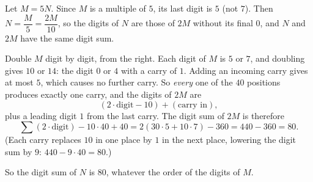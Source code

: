 Let $M=5N$. Since $M$ is a multiple of $5$, its last digit is $5$ (not $7$). Then $N=\dfrac{M}{5}=\dfrac{2M}{10}$, so the digits of $N$ are those of $2M$ without its final $0$, and $N$ and $2M$ have the same digit sum.

Double $M$ digit by digit, from the right. Each digit of $M$ is $5$ or $7$, and doubling gives $10$ or $14$: the digit $0$ or $4$ with a carry of $1$. Adding an incoming carry gives at most $5$, which causes no further carry. So \emph{every} one of the $40$ positions produces exactly one carry, and the digits of $2M$ are
\[
(2\cdot\text{digit} - 10) + (\text{carry in}),
\]
plus a leading digit $1$ from the last carry. The digit sum of $2M$ is therefore
\[
\sum(2\cdot\text{digit})-10\cdot40+40=2(30\cdot5+10\cdot7)-360=440-360=80 .
\]
(Each carry replaces $10$ in one place by $1$ in the next place, lowering the digit sum by $9$: $440-9\cdot40=80$.)

So the digit sum of $N$ is $\boxed{80}$, whatever the order of the digits of $M$.
